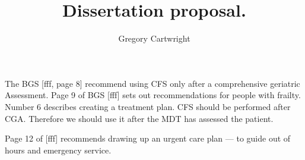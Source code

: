\documentclass[12pt,a4paper,oneside,titlepage]{article}
\begin{document}
\author{Gregory Cartwright}
\title{Dissertation proposal.}
\maketitle
The BGS [fff, page 8] recommend using CFS only after a comprehensive geriatric Assessment.
Page 9 of BGS [fff] sets out recommendations for people with frailty.
Number 6 describes creating a treatment plan.
CFS should be performed after CGA. Therefore we should use it after the MDT has assessed the patient.

Page 12 of [fff] recommends drawing up an urgent care plan --- to guide out of hours and emergency service.
\end{document}
